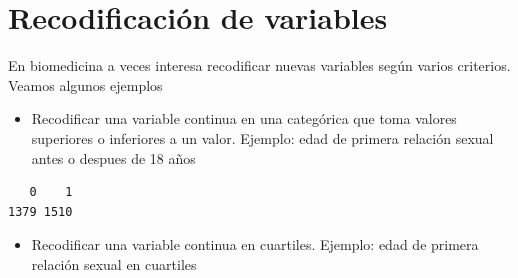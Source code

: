 \documentclass[
]{book}
\newenvironment{Shaded}{\begin{snugshade}}{\end{snugshade}}
\newcommand{\AttributeTok}[1]{\textcolor[rgb]{0.77,0.63,0.00}{#1}}
\newcommand{\ConstantTok}[1]{\textcolor[rgb]{0.00,0.00,0.00}{#1}}
\newcommand{\DecValTok}[1]{\textcolor[rgb]{0.00,0.00,0.81}{#1}}
\newcommand{\FunctionTok}[1]{\textcolor[rgb]{0.00,0.00,0.00}{#1}}
\newcommand{\NormalTok}[1]{#1}
\newcommand{\OtherTok}[1]{\textcolor[rgb]{0.56,0.35,0.01}{#1}}
\newcommand{\SpecialCharTok}[1]{\textcolor[rgb]{0.00,0.00,0.00}{#1}}
\providecommand{\tightlist}{%
  \setlength{\itemsep}{0pt}\setlength{\parskip}{0pt}}
\begin{document}
\hypertarget{recodificaciuxf3n-de-variables}{%
\section{Recodificación de variables}\label{recodificaciuxf3n-de-variables}}

En biomedicina a veces interesa recodificar nuevas variables según varios criterios. Veamos algunos ejemplos

\begin{itemize}
\tightlist
\item
  Recodificar una variable continua en una categórica que toma valores superiores o inferiores a un valor. Ejemplo: edad de primera relación sexual antes o despues de 18 años
\end{itemize}

\begin{Shaded}
\end{Shaded}

\begin{verbatim}
   0    1 
1379 1510 
\end{verbatim}

\begin{itemize}
\tightlist
\item
  Recodificar una variable continua en cuartiles. Ejemplo: edad de primera relación sexual en cuartiles
\end{itemize}

\begin{Shaded}
\end{Shaded}
\end{document}
